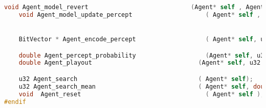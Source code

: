 \documentclass[fancychapters]{report}   	%
\begin{document}
\begin{lstlisting}[language=C,caption={agent.h}]
    void Agent_model_revert                            (Agent* self , AgentUndo* undo);
    void Agent_model_update_percept                    ( Agent* self , u32 observation, u32 reward );


    BitVector * Agent_encode_percept                   ( Agent* self, u32 observation, u32 reward);

    double Agent_percept_probability                   (Agent* self, u32 observation, u32 reward);
    double Agent_playout                             (Agent* self, u32 horizon);

    u32 Agent_search                                 ( Agent* self);
    u32 Agent_search_mean                            ( Agent* self, double *mean);
    void  Agent_reset                                  ( Agent* self );
#endif
\end{lstlisting}
\end{document}

